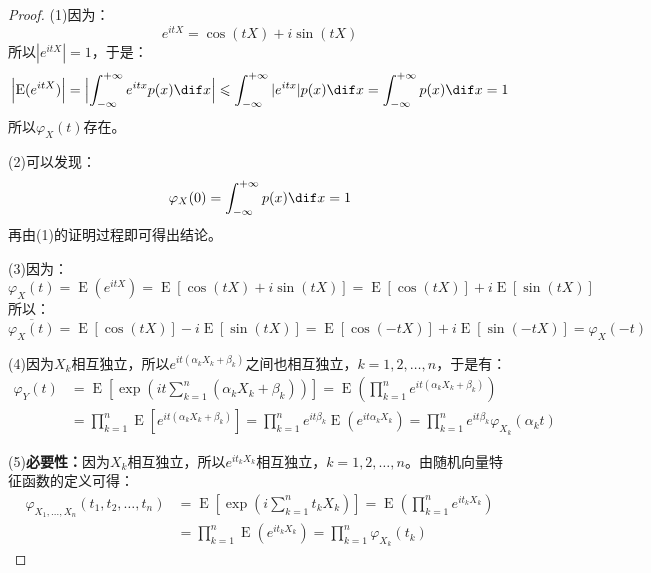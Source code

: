 \begin{proof}
	(1)因为：
	\begin{equation*}
		e^{itX}=\cos(tX)+i\sin(tX)
	\end{equation*}
	所以$|e^{itX}|=1$，于是：
	\begin{equation*}
		\Bigl|\operatorname{E}(e^{itX})\Bigr|=\Bigl|\int_{-\infty}^{+\infty}e^{itx}p(x)\dif x\Bigr|\leqslant\int_{-\infty}^{+\infty}|e^{itx}|p(x)\dif x=\int_{-\infty}^{+\infty}p(x)\dif x=1
	\end{equation*}
	所以$\varphi_X(t)$存在。\par
	(2)可以发现：
	\begin{equation*}
		\varphi_X(0)=\int_{-\infty}^{+\infty}p(x)\dif x=1
	\end{equation*}
	再由(1)的证明过程即可得出结论。\par
	(3)因为：
	\begin{equation*}
		\varphi_X(t)=\operatorname{E}(e^{itX})=\operatorname{E}[\cos(tX)+i\sin(tX)]=\operatorname{E}[\cos(tX)]+i\operatorname{E}[\sin(tX)]
	\end{equation*}
	所以：
	\begin{equation*}
		\overline{\varphi_X(t)}=\operatorname{E}[\cos(tX)]-i\operatorname{E}[\sin(tX)]=\operatorname{E}[\cos(-tX)]+i\operatorname{E}[\sin(-tX)]=\varphi_X(-t)
	\end{equation*}\par
	(4)因为$X_k$相互独立，所以$e^{it(\alpha_kX_k+\beta_k)}$之间也相互独立，$k=1,2,\dots,n$，于是有：
	\begin{align*}
		\varphi_Y(t)
		&=\operatorname{E}\left[\exp\left(it\sum_{k=1}^{n}(\alpha_kX_k+\beta_k)\right)\right]
		=\operatorname{E}\left(\prod_{k=1}^ne^{it(\alpha_kX_k+\beta_k)}\right) \\
		&=\prod_{k=1}^n\operatorname{E}[e^{it(\alpha_kX_k+\beta_k)}]
		=\prod_{k=1}^ne^{it\beta_k}\operatorname{E}(e^{it\alpha_kX_k})
		=\prod_{k=1}^ne^{it\beta_k}\varphi_{X_k}(\alpha_kt)
	\end{align*}\par
	(5)\textbf{必要性：}因为$X_k$相互独立，所以$e^{it_kX_k}$相互独立，$k=1,2,\dots,n$。由随机向量特征函数的定义可得：
	\begin{align*}
		\varphi_{X_1,\dots,X_n}(t_1,t_2,\dots,t_n)
		&=\operatorname{E}\left[\exp\left(i\sum_{k=1}^{n}t_kX_k\right)\right]
		=\operatorname{E}\left(\prod_{k=1}^ne^{it_kX_k}\right) \\
		&=\prod_{k=1}^n\operatorname{E}(e^{it_kX_k})
		=\prod_{k=1}^n\varphi_{X_k}(t_k)
	\end{align*}

\end{proof}
